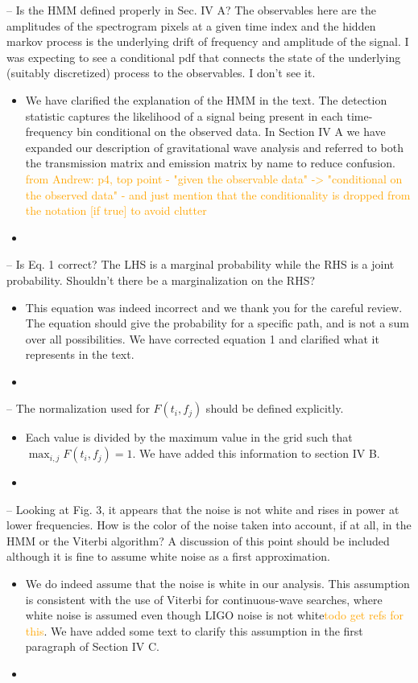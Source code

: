 \documentclass{article}
\newcommand{\han}{\textcolor{orange}}
\begin{document}
\noindent
-- Is the HMM defined properly in Sec. IV A? The observables here are the amplitudes of the spectrogram pixels at a given time index and the hidden markov process is the underlying drift of frequency and amplitude of the signal. I was expecting to see a conditional pdf that connects the state of the underlying (suitably discretized) process to the observables. I don't see it.
\begin{itemize}
\item We have clarified the explanation of the HMM in the text. The detection statistic captures the likelihood of a signal being present in each time-frequency bin conditional on the observed data. In Section IV A we have expanded our description of gravitational wave analysis and referred to both the transmission matrix and emission matrix by name to reduce confusion. \han{from Andrew: p4, top point - "given the observable data" -> "conditional on the observed data" - and just mention that the conditionality is dropped from the notation [if true] to avoid clutter}
\item[]
\end{itemize}

\noindent
-- Is Eq. 1 correct? The LHS is a marginal probability while the RHS is a joint probability. Shouldn't there be a marginalization on the RHS?
\begin{itemize}
\item This equation was indeed incorrect and we thank you for the careful review. The equation should give the probability for a specific path, and is not a sum over all possibilities. We have corrected equation 1 and clarified what it represents in the text.
\item[]
\end{itemize}

\noindent
-- The normalization used for $F(t_i, f_j)$ should be defined explicitly. 
\begin{itemize}
\item Each value is divided by the maximum value in the grid such that $\max_{i,j} F(t_i, f_j) = 1$. We have added this information to section IV B.
\item[]
\end{itemize}

\noindent
-- Looking at Fig. 3, it appears that the noise is not white and rises in power at lower frequencies. How is the color of the noise taken into account, if at all, in the HMM or the Viterbi algorithm? A discussion of this point should be included although it is fine to assume white noise as a first approximation. 
\begin{itemize}
\item We do indeed assume that the noise is white in our analysis. This assumption is consistent with the use of Viterbi for continuous-wave searches, where white noise is assumed even though LIGO noise is not white\han{todo get refs for this}. We have added some text to clarify this assumption in the first paragraph of Section IV C.
\item[]
\end{itemize}
\end{document}
